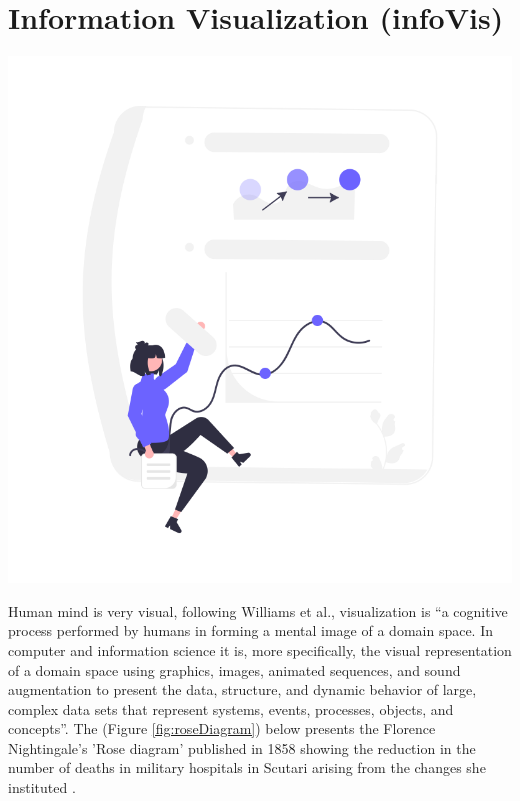 \chapter{Information Visualization (infoVis)}

\label{chapitre3}
		
		\includegraphics [width=1 \linewidth, height=0.8\textheight, keepaspectratio] {images/chaptersFigures/dataViz.png}
		
	
		
    \newpage
    \thispagestyle{plain}

Human mind is very visual, following Williams et al., visualization is “a cognitive process performed by humans in forming a mental image of a domain space. In computer and information science it is, more specifically, the visual representation of a domain space using graphics, images, animated sequences, and sound augmentation to present the data, structure, and dynamic behavior of large, complex data sets that represent systems, events, processes, objects, and concepts”\cite{williamsVisualization1995}. The (Figure \ref{fig:roseDiagram}) below presents the Florence Nightingale's 'Rose diagram' published in 1858 showing the reduction in the number of deaths in military hospitals in Scutari arising from the changes she instituted\cite{spence2001information} .

